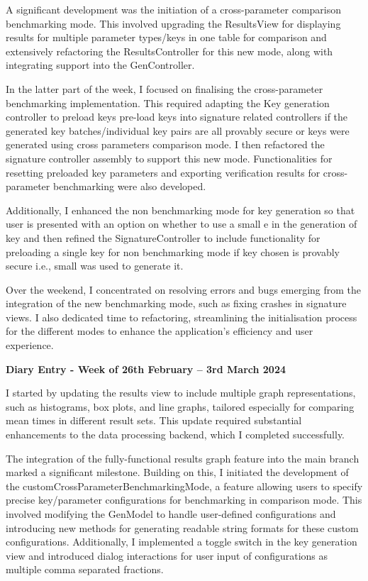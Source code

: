 \documentclass[]{final_report}
\theoremstyle{definition}
\begin{document}
A significant development was the initiation of a cross-parameter comparison benchmarking mode. This
involved upgrading the ResultsView for displaying results for multiple parameter types/keys in one
table for comparison and extensively refactoring the ResultsController for this new mode, along with
integrating support into the GenController.

In the latter part of the week, I focused on finalising the cross-parameter benchmarking
implementation. This required adapting the Key generation controller to preload keys pre-load keys
into signature related controllers if the generated key batches/individual key pairs are all
provably secure or keys were generated using cross parameters comparison mode. I then refactored the
signature controller assembly to support this new mode. Functionalities for resetting preloaded key
parameters and exporting verification results for cross-parameter benchmarking were also developed.

Additionally, I enhanced the non benchmarking mode for key generation so that user is presented with
an option on whether to use a small e in the generation of key and then refined the
SignatureController to include functionality for preloading a single key for non benchmarking mode
if key chosen is provably secure i.e., small was used to generate it.

Over the weekend, I concentrated on resolving errors and bugs emerging from the integration of the
new benchmarking mode, such as fixing crashes in signature views. I also dedicated time to
refactoring, streamlining the initialisation process for the different modes to enhance the
application's efficiency and user experience.

\textbf{Diary Entry - Week of 26th February – 3rd March 2024}

I started by updating the results view to include multiple graph representations, such as
histograms, box plots, and line graphs, tailored especially for comparing mean times in different
result sets. This update required substantial enhancements to the data processing backend, which I
completed successfully.

The integration of the fully-functional results graph feature into the main branch marked a
significant milestone. Building on this, I initiated the development of the
customCrossParameterBenchmarkingMode, a feature allowing users to specify precise key/parameter
configurations for benchmarking in comparison mode. This involved modifying the GenModel to handle
user-defined configurations and introducing new methods for generating readable string formats for
these custom configurations. Additionally, I implemented a toggle switch in the key generation view
and introduced dialog interactions for user input of configurations as multiple comma separated fractions.
\end{document}
